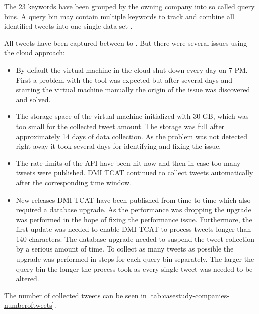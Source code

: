 The 23 keywords have been grouped by the owning company into so called query bins.
A query bin may contain multiple keywords to track and combine all identified tweets into one single data set \cite{Borra2014}.

All tweets have been captured between  to .
But there were several issues using the cloud approach:

\begin{itemize}

  \item By default the virtual machine in the cloud shut down every day on 7 PM.
    First a problem with the tool was expected but after several days and starting the virtual machine manually the origin of the issue was discovered and solved.

  \item The storage space of the virtual machine initialized with 30 \ac{GB}, which was too small for the collected tweet amount.
    The storage was full after approximately 14 days of data collection.
    As the problem was not detected right away it took several days for identifying and fixing the issue.

  \item The rate limits of the \ac{API} have been hit now and then in case too many tweets were published.
    DMI TCAT continued to collect tweets automatically after the corresponding time window.

  \item New releases DMI TCAT have been published from time to time which also required a database upgrade.
    As the performance was dropping the upgrade was performed in the hope of fixing the performance issue.
    Furthermore, the first update was needed to enable DMI TCAT to process tweets longer than 140 characters.
    The database upgrade needed to suspend the tweet collection by a serious amount of time.
    To collect as many tweets as possible the upgrade was performed in steps for each query bin separately.
    The larger the query bin the longer the process took as every single tweet was needed to be altered.

\end{itemize}

The number of collected tweets can be seen in \cref{tab:casestudy-companies-numberoftweets}.

